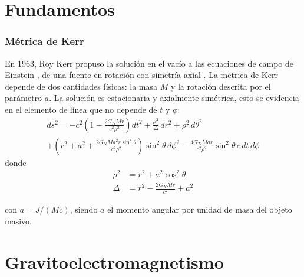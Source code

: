 \documentclass[aspectratio=169,10pt,usenames,dvipsnames,spanish]{beamer}
\begin{document}
\section{Fundamentos}
\begin{frame}
\frametitle{Métrica de Kerr}
En 1963, Roy Kerr propuso la solución en el vacío a las ecuaciones de campo de Einstein
, de una fuente en rotación con simetría axial \cite{Kerr1963}. La métrica de Kerr depende de dos cantidades físicas: la masa $M$ y la rotación descrita por el parámetro $a$. La solución es estacionaria y axialmente simétrica, esto se evidencia en el elemento de línea que no depende de $t$ y $\phi$:
\begin{multline} \label{Metrica_Kerr}
ds^2=-c^2\left(1-\frac{2G_NMr}{c^2\rho^2}\right)dt^2+\frac{\rho^2}{\Delta}\, dr^2+\rho^2 \,d\theta^2\\+\left(r^2+a^2+\frac{2G_NMa^2r \sin^2 \theta}{c^2 \rho^2}\right)\sin^2 \theta \,d\phi^2-\frac{4G_NMar}{c^2\rho^2}\sin^2\theta\, c\,dt\, d\phi
\end{multline}
donde
\begin{align} \label{eq1}
\rho^2 &= r^2+a^2 \cos^2\theta \\ 
\Delta&=r^2-\frac{2G_NMr}{c^2}+a^2
\end{align}


con $a=J/(Mc)$, siendo $a$ el momento angular por unidad de masa del objeto masivo.
\end{frame}





\section{Gravitoelectromagnetismo}
\end{document}
